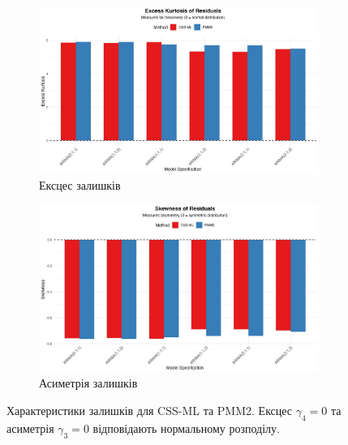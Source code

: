 \documentclass[12pt,a4paper]{article}
\begin{document}
\begin{figure}[htbp]
\centering
\begin{subfigure}[b]{0.48\textwidth}
    \centering
    \includegraphics[width=\textwidth]{figures/05_kurtosis_comparison.pdf}
    \caption{Ексцес залишків}
    \label{fig:wti_kurtosis}
\end{subfigure}
\hfill
\begin{subfigure}[b]{0.48\textwidth}
    \centering
    \includegraphics[width=\textwidth]{figures/06_skewness_comparison.pdf}
    \caption{Асиметрія залишків}
    \label{fig:wti_skewness}
\end{subfigure}
\caption{Характеристики залишків для CSS-ML та PMM2. Ексцес $\gamma_4=0$ та асиметрія $\gamma_3=0$ відповідають нормальному розподілу.}
\label{fig:wti_residuals}
\end{figure}
\end{document}
